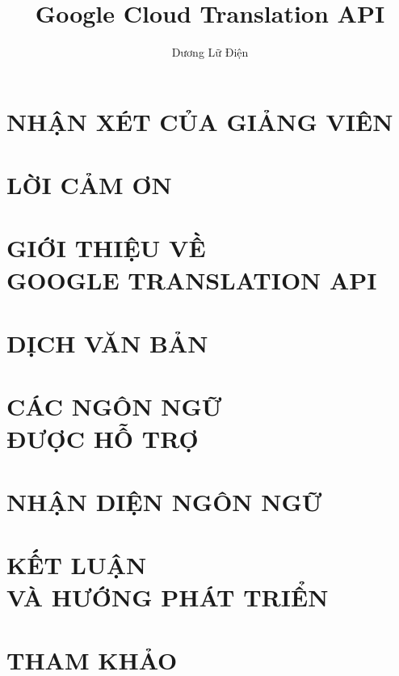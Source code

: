 \documentclass[a4paper,12pt,twoside,openright]{report}	%
\title{Google Cloud Translation API}	%
\author{Dương Lữ Điện}					%
\begin{document}

\chapter*{NHẬN XÉT CỦA GIẢNG VIÊN}


\chapter*{LỜI CẢM ƠN}

\tableofcontents
\listoffigures

\chapter{GIỚI THIỆU VỀ\\GOOGLE TRANSLATION API}

\chapter{DỊCH VĂN BẢN}


\chapter{CÁC NGÔN NGỮ\\ĐƯỢC HỖ TRỢ}


\chapter{NHẬN DIỆN NGÔN NGỮ}


\chapter{KẾT LUẬN\\VÀ HƯỚNG PHÁT TRIỂN}


\chapter*{THAM KHẢO}

\end{document}
